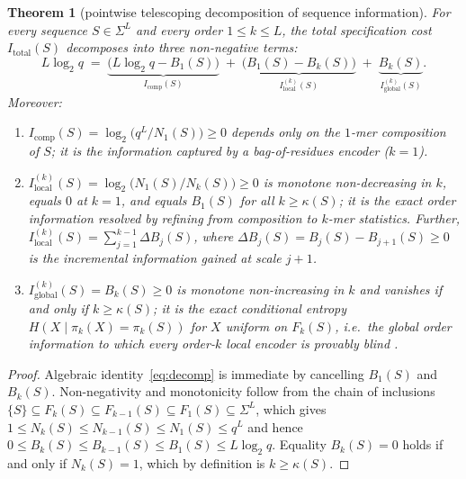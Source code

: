 \documentclass[11pt]{article}
\theoremstyle{plain}
\newtheorem{theorem}{Theorem}
\theoremstyle{definition}
\theoremstyle{remark}
\begin{document}
\begin{theorem}[pointwise telescoping decomposition of sequence information]\label{thm:decomp}
For every sequence $S\in\Sigma^L$ and every order $1\le k\le L$, the total specification cost $I_{\mathrm{total}}(S)$
decomposes into three non-negative terms:
\begin{equation}\label{eq:decomp}
L\log_2 q \;=\; \underbrace{\bigl(L\log_2 q - B_1(S)\bigr)}_{I_{\mathrm{comp}}(S)}
\;+\; \underbrace{\bigl(B_1(S) - B_k(S)\bigr)}_{I_{\mathrm{local}}^{(k)}(S)}
\;+\; \underbrace{B_k(S)}_{I_{\mathrm{global}}^{(k)}(S)}.
\end{equation}
Moreover:
\begin{enumerate}
\item $I_{\mathrm{comp}}(S)=\log_2\bigl(q^L/N_1(S)\bigr)\ge0$ depends only on the $1$-mer composition of $S$; it is
the information captured by a bag-of-residues encoder ($k=1$).
\item $I_{\mathrm{local}}^{(k)}(S)=\log_2\bigl(N_1(S)/N_k(S)\bigr)\ge0$ is monotone non-decreasing in $k$, equals $0$
at $k=1$, and equals $B_1(S)$ for all $k\ge\kappa(S)$; it is the exact order information resolved by refining from
composition to $k$-mer statistics. Further, $I_{\mathrm{local}}^{(k)}(S)=\sum_{j=1}^{k-1}\Delta B_j(S)$, where
$\Delta B_j(S)=B_j(S)-B_{j+1}(S)\ge0$ is the incremental information gained at scale $j+1$.
\item $I_{\mathrm{global}}^{(k)}(S)=B_k(S)\ge0$ is monotone non-increasing in $k$ and vanishes if and only if
$k\ge\kappa(S)$; it is the exact conditional entropy $H(X\mid\pi_k(X)=\pi_k(S))$ for $X$ uniform on $F_k(S)$, i.e.\
the global order information to which every order-$k$ local encoder is provably blind \cite{CC26c,CC26d}.
\end{enumerate}
\end{theorem}

\begin{proof}
Algebraic identity~\eqref{eq:decomp} is immediate by cancelling $B_1(S)$ and $B_k(S)$. Non-negativity and
monotonicity follow from the chain of inclusions $\{S\}\subseteq F_k(S)\subseteq F_{k-1}(S)\subseteq F_1(S)\subseteq\Sigma^L$,
which gives $1\le N_k(S)\le N_{k-1}(S)\le N_1(S)\le q^L$ and hence $0\le B_k(S)\le B_{k-1}(S)\le B_1(S)\le L\log_2 q$.
Equality $B_k(S)=0$ holds if and only if $N_k(S)=1$, which by definition is $k\ge\kappa(S)$.
\end{proof}
\end{document}
